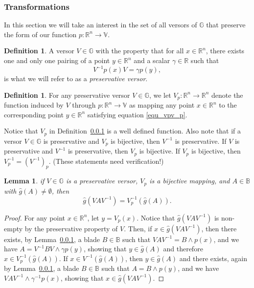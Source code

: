\documentclass{birkjour}
\newtheorem{lem}[thm]{Lemma}
\theoremstyle{definition}
\newtheorem{defn}[thm]{Definition}
\theoremstyle{remark}
\numberwithin{equation}{section}
\newcommand{\R}{\mathbb{R}}
\newcommand{\B}{\mathbb{B}}
\newcommand{\G}{\mathbb{G}}
\newcommand{\V}{\mathbb{V}}
\newcommand{\gh}{\hat{g}}
\begin{document}
\subsubsection{Transformations}

In this section we will take an interest in the set of all versors of $\G$ that preserve the form
of our function $p:\R^n\to\V$.
\begin{defn}
A versor $V\in\G$ with the property that for all $x\in\R^n$, there exists one and only one
pairing of a point $y\in\R^n$ and a scalar $\gamma\in\R$ such that
\begin{equation}\label{equ_vpv_p}
V^{-1}p(x)V = \gamma p(y),
\end{equation}
is what we will refer to as a {\it preservative versor}.
\end{defn}

\begin{defn}
For any preservative versor $V\in\G$, we let $V_p:\R^n\to\R^n$ denote
the function induced by $V$ through $p:\R^n\to\V$ as mapping any point $x\in\R^n$
to the corresponding point $y\in\R^n$ satisfying equation \eqref{equ_vpv_p}.
\end{defn}

Notice that $V_p$ in Definition~\ref{} is a well defined function.  Also note that
if a versor $V\in\G$ is preservative and $V_p$ is bijective, then
$V^{-1}$ is preservative.  If $V$ is preservative and $V^{-1}$ is preservative,
then $V_p$ is bijective.  If $V_p$ is bijective, then $V_p^{-1} = (V^{-1})_p$.
(These statements need verification!)

\begin{lem}
if $V\in\G$ is a preservative versor, $V_p$ is a bijective mapping, and $A\in\B$ with $\gh(A)\neq\emptyset$, then
\begin{equation}
\gh(VAV^{-1}) = V_p^{-1}(\gh(A)).
\end{equation}
\end{lem}
\begin{proof}
For any point $x\in\R^n$, let $y=V_p(x)$.  Notice that $\gh(VAV^{-1})$ is non-empty by
the preservative property of $V$.
Then, if $x\in\gh(VAV^{-1})$, then there exists, by Lemma~\ref{}, a blade $B\in\B$ such that
$VAV^{-1}=B\wedge p(x)$, and we have $A=V^{-1}BV\wedge\gamma p(y)$, showing that
$y\in\gh(A)$ and therefore $x\in V_p^{-1}(\gh(A))$.  If $x\in V^{-1}(\gh(A))$, then
$y\in\gh(A)$ and there exists, again by Lemma~\ref{}, a blade $B\in\B$ such that
$A=B\wedge p(y)$, and we have $VAV^{-1}\wedge\gamma^{-1}p(x)$, showing that
$x\in\gh(VAV^{-1})$.
\end{proof}
\end{document}
